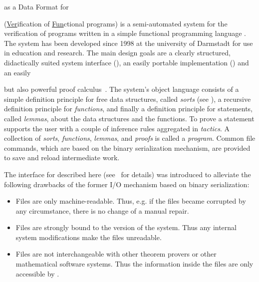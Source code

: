 
\begin{omgroup}[id=verifun,short=VeriFun,creators={nmueller}]
  {{\omdoc} as a Data Format for {\verifun}}


{\verifun} (\underline{Ver}ification of \underline{Fun}ctional programs) is a
semi-automated system for the verification of programs written in a simple functional
programming language {\fp}. The system has been developed since 1998 at the university of
Darmstadt for use in education and research. The main design goals are a clearly
structured, didactically suited system interface (), an easily portable
implementation ({\java}) and an easily
\begin{wrapfigure}{r}{8cm}\vspace*{-.3cm}
  \texttt{[image: \\projectsPath\{verifun/verifun]}}
  \label{fig:verifun}\caption{A {\verifun} session}\vspace*{-.3cm}
\end{wrapfigure}
but also powerful proof calculus~\cite{WS:VFTut}. The system's object language consists of
a simple definition principle for free data structures, called {\emph{sorts}} (see
{}), a recursive definition principle for {\emph{functions}}, and
finally a definition principle for statements, called {\emph{lemmas}}, about the data
structures and the functions. To prove a statement {\verifun} supports the user with a
couple of inference rules aggregated in {\emph{tactics}}. A collection of {\emph{sorts}},
{\emph{functions}}, {\emph{lemmas}}, and {\emph{proofs}} is called a {\verifun}
{\emph{program}}. Common file commands, which are based on the {\java} binary
serialization mechanism, are provided to save and reload intermediate work.

The {\omdoc} interface for {\verifun} described here (see~\cite{NRM:DA05} for details) was
introduced to alleviate the following drawbacks of the former I/O mechanism based on
{\java} binary serialization:
\begin{itemize}
\item Files are only machine-readable. Thus, e.g. if the files became corrupted by any
  circumstance, there is no change of a manual repair.
\item Files are strongly bound to the version of the system. Thus any internal system
  modifications make the files unreadable.
\item Files are not interchangeable with other theorem provers or other mathematical
  software systems. Thus the information inside the files are only accessible by
  {\verifun}.
\end{itemize}


\end{omgroup}
